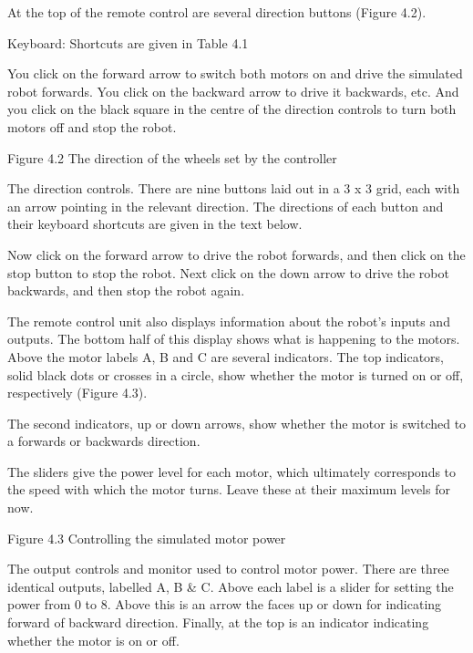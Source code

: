 \documentclass[letterpaper,10pt,english]{sphinxmanual}
\begin{document}
At the top of the remote control are several direction buttons (Figure 4.2).





Keyboard: Shortcuts are given in Table 4.1





You click on the forward arrow to switch both motors on and drive the simulated robot forwards. You click on the backward arrow to drive it backwards, etc. And you click on the black square in the centre of the direction controls to turn both motors off and stop the robot.

\noindent{}

Figure 4.2 The direction of the wheels set by the controller

The direction controls. There are nine buttons laid out in a 3 x 3 grid, each with an arrow pointing in the relevant direction. The directions of each button and their keyboard shortcuts are given in the text below.

Now click on the forward arrow to drive the robot forwards, and then click on the stop button to stop the robot. Next click on the down arrow to drive the robot backwards, and then stop the robot again.

The remote control unit also displays information about the robot’s inputs and outputs. The bottom half of this display shows what is happening to the motors. Above the motor labels A, B and C are several indicators. The top indicators, solid black dots or crosses in a circle, show whether the motor is turned on or off, respectively (Figure 4.3).

The second indicators, up or down arrows, show whether the motor is switched to a forwards or backwards direction.

The sliders give the power level for each motor, which ultimately corresponds to the speed with which the motor turns. Leave these at their maximum levels for now.

\noindent{}

Figure 4.3 Controlling the simulated motor power

The output controls and monitor used to control motor power. There are three identical outputs, labelled A, B \& C. Above each label is a slider for setting the power from 0 to 8. Above this is an arrow the faces up or down for indicating forward of backward direction. Finally, at the top is an indicator indicating whether the motor is on or off.
\end{document}
